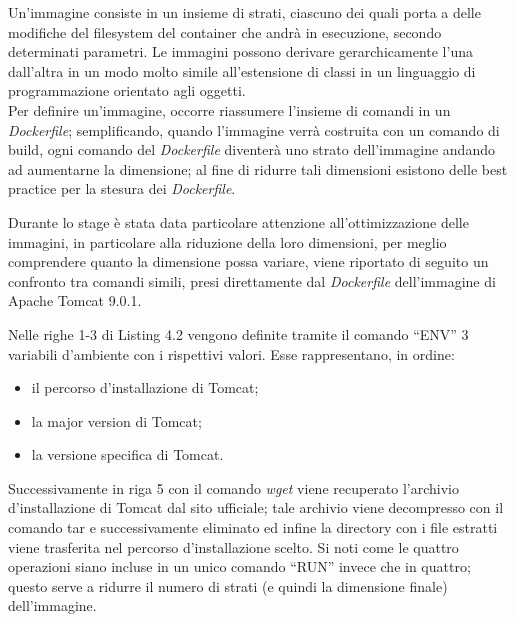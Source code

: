 Un'\gls{immagine} consiste in un insieme di strati, ciascuno dei quali porta a delle modifiche del filesystem del \gls{container} che andrà in esecuzione, secondo determinati parametri. Le immagini possono derivare gerarchicamente l'una dall'altra in un modo molto simile all'estensione di classi in un linguaggio di programmazione orientato agli oggetti. \\ 

Per definire un'immagine, occorre riassumere l'insieme di comandi\cite{site:docker-command-for-cli} in un \textit{Dockerfile}; semplificando, quando l'immagine verrà costruita con un comando di build, ogni comando del \textit{Dockerfile} diventerà uno strato dell'immagine andando ad aumentarne la dimensione; al fine di ridurre tali dimensioni\cite{site:docker-development-best-practice} esistono delle best practice per la stesura dei \textit{Dockerfile}\cite{site:best-practice-for-dockerfile}.

Durante lo stage è stata data particolare attenzione all'ottimizzazione delle immagini, in particolare alla riduzione della loro dimensioni, per meglio comprendere quanto la dimensione possa variare, viene riportato di seguito un confronto tra comandi simili, presi direttamente dal \textit{Dockerfile} dell'immagine di Apache Tomcat 9.0.1.

  

Nelle righe 1-3 di Listing 4.2 vengono definite tramite il comando ``ENV'' 3 variabili d'ambiente con i rispettivi valori. Esse rappresentano, in ordine:
\begin{itemize}
    \item il percorso d'installazione di Tomcat;
    \item la major version di Tomcat;
    \item la versione specifica di Tomcat.
\end{itemize} 
Successivamente in riga 5 con il comando \textit{wget} viene recuperato l'archivio d'installazione di Tomcat dal sito ufficiale; tale archivio viene decompresso con il comando tar e successivamente eliminato ed infine la directory con i file estratti viene trasferita nel percorso d'installazione scelto. Si noti come le quattro operazioni siano incluse in un unico comando ``RUN'' invece che in quattro; questo serve a ridurre il numero di strati (e quindi la dimensione finale) dell'immagine.\\

